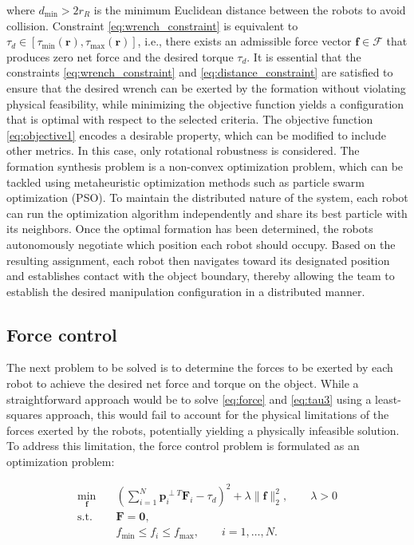 where $d_{\min} > 2r_R$ is the minimum Euclidean distance between the robots to avoid collision. Constraint \eqref{eq:wrench_constraint} is equivalent to $\tau_d\in[\tau_{\min}(\mathbf{r}),\tau_{\max}(\mathbf{r})]$, i.e., there exists an admissible force vector $\mathbf{f}\in\mathcal{F}$ that produces zero net force and the desired torque $\tau_d$. It is essential that the constraints \eqref{eq:wrench_constraint} and \eqref{eq:distance_constraint} are satisfied to ensure that the desired wrench can be exerted by the formation without violating physical feasibility, while minimizing the objective function yields a configuration that is optimal with respect to the selected criteria. The objective function \eqref{eq:objective1} encodes a desirable property, which can be modified to include other metrics. In this case, only rotational robustness is considered. The formation synthesis problem is a non-convex optimization problem, which can be tackled using metaheuristic optimization methods such as particle swarm optimization (PSO). To maintain the distributed nature of the system, each robot can run the optimization algorithm independently and share its best particle with its neighbors. Once the optimal formation has been determined, the robots autonomously negotiate which position each robot should occupy. Based on the resulting assignment, each robot then navigates toward its designated position and establishes contact with the object boundary, thereby allowing the team to establish the desired manipulation configuration in a distributed manner.

\subsection{Force control}

The next problem to be solved is to determine the forces to be exerted by each robot to achieve the desired net force and torque on the object. While a straightforward approach would be to solve \eqref{eq:force} and \eqref{eq:tau3} using a least-squares approach, this would fail to account for the physical limitations of the forces exerted by the robots, potentially yielding a physically infeasible solution. To address this limitation, the force control problem is formulated as an optimization problem:

\begin{subequations}
\begin{align}
\min_{\mathbf{f}} \quad
& \left(
\sum_{i=1}^{N}
\mathbf{p}_{i}^{\perp T}\mathbf{F}_{i}
-\tau_d
\right)^2
+\lambda \|\mathbf{f}\|_2^2,
\qquad \lambda>0
\label{eq:objective2}\\
\text{s.t.}\quad
& \mathbf{F}=\mathbf{0},
\label{eq:force_balance}\\
& f_{\min} \leq f_i\leq f_{\max},
\qquad i=1,\ldots,N.
\label{eq:force_bound}
\end{align}
\label{eq:force_control}
\end{subequations}

